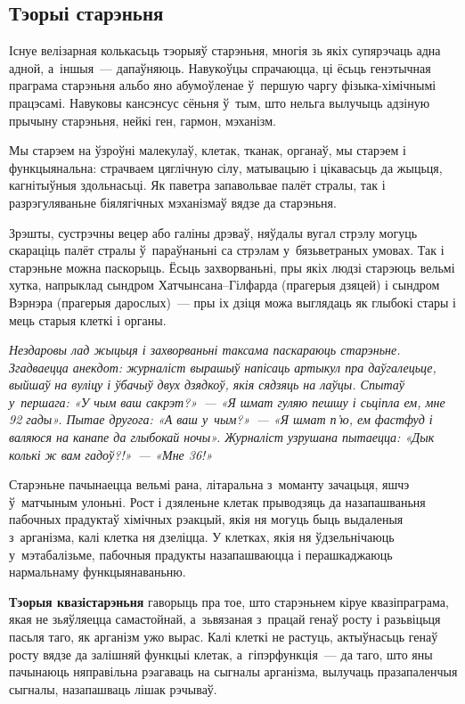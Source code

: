 \subsection*{Тэорыі старэньня} 

Існуе велізарная колькасьць тэорыяў старэньня, многія зь якіх супярэчаць адна адной, а~іншыя~--- дапаўняюць. Навукоўцы спрачаюцца, ці ёсьць генэтычная праграма старэньня альбо яно абумоўленае ў~першую чаргу фізыка-хімічнымі працэсамі. Навуковы кансэнсус сёньня ў~тым, што нельга вылучыць адзіную прычыну старэньня, нейкі ген, гармон, мэханізм. 


Мы старэем на ўзроўні малекулаў, клетак, тканак, органаў, мы старэем і функцыянальна: страчваем цяглічную сілу, матывацыю і цікавасьць да жыцьця, кагнітыўныя здольнасьці. Як паветра запавольвае палёт стралы, так і разрэгуляваньне біялягічных мэханізмаў вядзе да старэньня.

Зрэшты, сустрэчны вецер або галіны дрэваў, няўдалы вугал стрэлу могуць скараціць палёт стралы ў~параўнаньні са стрэлам у~бязьветраных умовах. Так і старэньне можна паскорыць. Ёсьць захворваньні, пры якіх людзі старэюць вельмі хутка, напрыклад сындром Хатчынсана--Гілфарда (прагерыя дзяцей) і сындром Вэрнэра (прагерыя дарослых)~--- пры іх дзіця можа выглядаць як глыбокі стары і мець старыя клеткі і органы.

\emph{Нездаровы лад жыцьця і захворваньні таксама паскараюць старэньне. Згадваецца анекдот: журналіст вырашыў напісаць артыкул пра даўгалецьце, выйшаў на вуліцу і ўбачыў двух дзядкоў, якія сядзяць на лаўцы. Спытаў у~першага: «У чым ваш сакрэт?»~--- «Я шмат гуляю пешшу і сьціпла ем, мне 92 гады». Пытае другога: «А ваш у~чым?»~--- «Я шмат п'ю, ем фастфуд і валяюся на канапе да глыбокай ночы». Журналіст узрушана пытаецца: «Дык колькі ж вам гадоў?!»~--- «Мне 36!»}

Старэньне пачынаецца вельмі рана, літаральна з~моманту зачацьця, яшчэ ў~матчыным улоньні. Рост і дзяленьне клетак прыводзяць да назапашваньня пабочных прадуктаў хімічных рэакцый, якія ня могуць быць выдаленыя з~арганізма, калі клетка ня дзеліцца. У клетках, якія ня ўдзельнічаюць у~мэтабалізьме, пабочныя прадукты назапашваюцца і перашкаджаюць нармальнаму функцыянаваньню.

\textbf{Тэорыя квазістарэньня} гаворыць пра тое, што старэньнем кіруе квазіпраграма, якая не зьяўляецца самастойнай, а~зьвязаная з~працай генаў росту і разьвіцьця пасьля таго, як арганізм ужо вырас. Калі клеткі не растуць, актыўнасьць генаў росту вядзе да залішняй функцыі клетак, а~гіпэрфункція~--- да таго, што яны пачынаюць няправільна рэагаваць на сыгналы арганізма, вылучаць празапаленчыя сыгналы, назапашваць лішак рэчываў.

